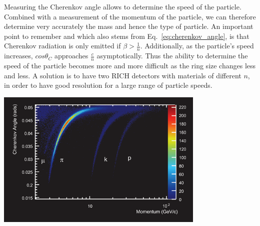 Measuring the Cherenkov angle allows to determine the speed of the particle. Combined with a measurement of the momentum of the particle, we can therefore determine very accurately the mass and hence the type of particle. An important point to remember and which also stems from Eq.~\ref{eq:cherenkov_angle}, is that Cherenkov radiation is only emitted if $\beta>\frac{1}{n}$. Additionally, as the particle's speed increases, $cos\theta_{C}$ approaches $\frac{c}{n}$ asymptotically. Thus the ability to determine the speed of the particle becomes more and more difficult as the ring size changes less and less. A solution is to have two RICH detectors with materials of different $n$, in order to have good resolution for a large range of particle speeds.
\begin{center}
\includegraphics[width=0.75\textwidth]{fig/detector/lhcb_cherenkov_vs_momentum.png}
\end{center}


